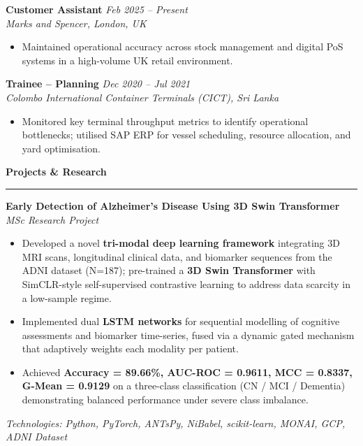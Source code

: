 \documentclass[a4paper,10pt]{article}
\newcommand{\sect}[1]{\vspace{8pt}\noindent\textbf{\color{heading}\large #1}\vspace{3pt}\hrule\vspace{6pt}}
\begin{document}
\noindent\textbf{Customer Assistant} \hfill \textit{Feb 2025 -- Present} \\
\textit{Marks and Spencer, London, UK}
\begin{itemize}[leftmargin=*, topsep=2pt, itemsep=1pt]
    \item Maintained operational accuracy across stock management and digital PoS systems in a high-volume UK retail environment.
\end{itemize}
\vspace{4pt}

\noindent\textbf{Trainee -- Planning} \hfill \textit{Dec 2020 -- Jul 2021} \\
\textit{Colombo International Container Terminals (CICT), Sri Lanka}
\begin{itemize}[leftmargin=*, topsep=2pt, itemsep=1pt]
    \item Monitored key terminal throughput metrics to identify operational bottlenecks; utilised SAP ERP for vessel scheduling, resource allocation, and yard optimisation.
\end{itemize}

\sect{Projects \& Research}

\noindent\textbf{Early Detection of Alzheimer's Disease Using 3D Swin Transformer} \hfill \textit{MSc Research Project}
\begin{itemize}[leftmargin=*, topsep=4pt, itemsep=2pt]
    \item Developed a novel \textbf{tri-modal deep learning framework} integrating 3D MRI scans, longitudinal clinical data, and biomarker sequences from the ADNI dataset (N=187); pre-trained a \textbf{3D Swin Transformer} with SimCLR-style self-supervised contrastive learning to address data scarcity in a low-sample regime.
    \item Implemented dual \textbf{LSTM networks} for sequential modelling of cognitive assessments and biomarker time-series, fused via a dynamic gated mechanism that adaptively weights each modality per patient.
    \item Achieved \textbf{Accuracy = 89.66\%, AUC-ROC = 0.9611, MCC = 0.8337, G-Mean = 0.9129} on a three-class classification (CN / MCI / Dementia) demonstrating balanced performance under severe class imbalance.
\end{itemize}
\textit{Technologies: Python, PyTorch, ANTsPy, NiBabel, scikit-learn, MONAI, GCP, ADNI Dataset}
\end{document}
